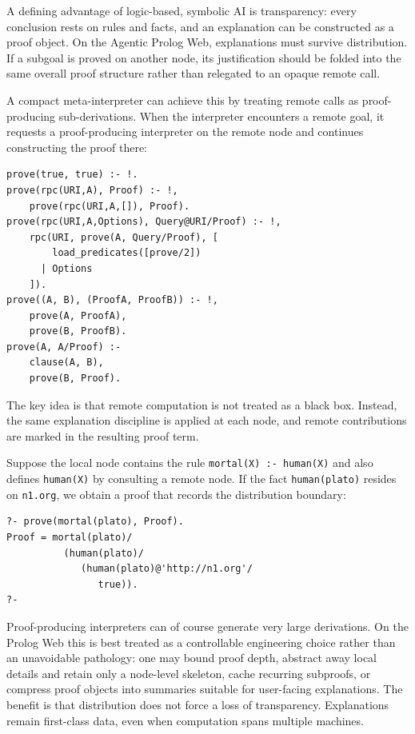 A defining advantage of logic-based, symbolic AI is transparency: every conclusion rests on rules and facts, and an explanation can be constructed as a proof object. On the Agentic Prolog Web, explanations must survive distribution. If a subgoal is proved on another node, its justification should be folded into the same overall proof structure rather than relegated to an opaque remote call.

A compact meta-interpreter can achieve this by treating remote calls as proof-producing sub-derivations. When the interpreter encounters a remote goal, it requests a proof-producing interpreter on the remote node and continues constructing the proof there:

\begin{verbatim}
prove(true, true) :- !.
prove(rpc(URI,A), Proof) :- !,
    prove(rpc(URI,A,[]), Proof).
prove(rpc(URI,A,Options), Query@URI/Proof) :- !,
    rpc(URI, prove(A, Query/Proof), [
        load_predicates([prove/2])
      | Options
    ]).
prove((A, B), (ProofA, ProofB)) :- !,
    prove(A, ProofA),
    prove(B, ProofB).
prove(A, A/Proof) :-
    clause(A, B),
    prove(B, Proof).
\end{verbatim}

\noindent The key idea is that remote computation is not treated as a black box. Instead, the same explanation discipline is applied at each node, and remote contributions are marked in the resulting proof term.

Suppose the local node contains the rule \texttt{mortal(X)\,:-\,human(X)} and also defines \texttt{human(X)} by consulting a remote node. If the fact \texttt{human(plato)} resides on \texttt{n1.org}, we obtain a proof that records the distribution boundary:

\begin{verbatim}
?- prove(mortal(plato), Proof).
Proof = mortal(plato)/
          (human(plato)/
             (human(plato)@'http://n1.org'/
                true)).
?-
\end{verbatim}

\noindent Proof-producing interpreters can of course generate very large derivations. On the Prolog Web this is best treated as a controllable engineering choice rather than an unavoidable pathology: one may bound proof depth, abstract away local details and retain only a node-level skeleton, cache recurring subproofs, or compress proof objects into summaries suitable for user-facing explanations. The benefit is that distribution does not force a loss of transparency. Explanations remain first-class data, even when computation spans multiple machines.

